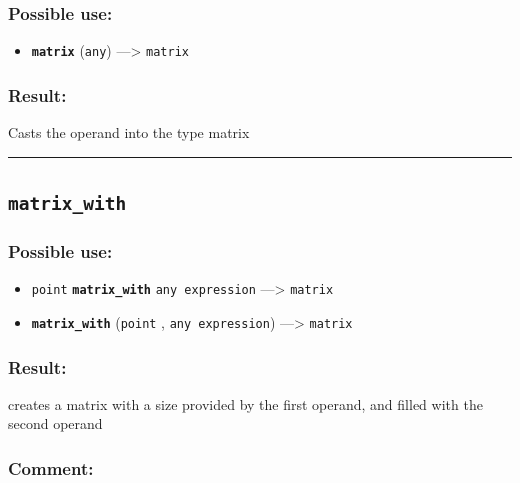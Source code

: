 \documentclass[]{book}
\providecommand{\tightlist}{%
  \setlength{\itemsep}{0pt}\setlength{\parskip}{0pt}}
\theoremstyle{definition}
\theoremstyle{definition}
\theoremstyle{definition}
\theoremstyle{remark}
\begin{document}
\subsubsection{Possible use:}\label{possible-use-337}

\begin{itemize}
\tightlist
\item
  \textbf{\texttt{matrix}} (\texttt{any}) ---\textgreater{}
  \texttt{matrix}
\end{itemize}

\subsubsection{Result:}\label{result-326}

Casts the operand into the type matrix

\begin{center}\rule{0.5\linewidth}{\linethickness}\end{center}

\subsection{\texorpdfstring{\texttt{matrix\_with}}{matrix\_with}}\label{matrix_with}

\subsubsection{Possible use:}\label{possible-use-338}

\begin{itemize}
\tightlist
\item
  \texttt{point} \textbf{\texttt{matrix\_with}} \texttt{any\ expression}
  ---\textgreater{} \texttt{matrix}
\item
  \textbf{\texttt{matrix\_with}} (\texttt{point} ,
  \texttt{any\ expression}) ---\textgreater{} \texttt{matrix}
\end{itemize}

\subsubsection{Result:}\label{result-327}

creates a matrix with a size provided by the first operand, and filled
with the second operand

\subsubsection{Comment:}\label{comment-64}
\end{document}

